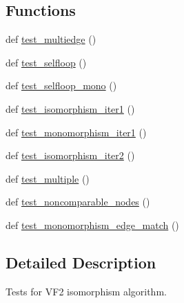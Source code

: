 \subsection*{Functions}
\begin{DoxyCompactItemize}
\item 
def \hyperlink{namespacenetworkx_1_1algorithms_1_1isomorphism_1_1tests_1_1test__isomorphvf2_a16c198267f05f1ce08e5c5418473c906}{test\+\_\+multiedge} ()
\item 
def \hyperlink{namespacenetworkx_1_1algorithms_1_1isomorphism_1_1tests_1_1test__isomorphvf2_a59ebaa66ef46936e5bb4ddc4760243f4}{test\+\_\+selfloop} ()
\item 
def \hyperlink{namespacenetworkx_1_1algorithms_1_1isomorphism_1_1tests_1_1test__isomorphvf2_ad5dff7d8c3e988e4abf0a11b30c84f46}{test\+\_\+selfloop\+\_\+mono} ()
\item 
def \hyperlink{namespacenetworkx_1_1algorithms_1_1isomorphism_1_1tests_1_1test__isomorphvf2_a9d6de0d276a24e97cc2cd3a0bd77cc5e}{test\+\_\+isomorphism\+\_\+iter1} ()
\item 
def \hyperlink{namespacenetworkx_1_1algorithms_1_1isomorphism_1_1tests_1_1test__isomorphvf2_ada11c231df898c8f62b5acba12546a44}{test\+\_\+monomorphism\+\_\+iter1} ()
\item 
def \hyperlink{namespacenetworkx_1_1algorithms_1_1isomorphism_1_1tests_1_1test__isomorphvf2_a72aa5ba60599cb4bce5ad1114b6163cb}{test\+\_\+isomorphism\+\_\+iter2} ()
\item 
def \hyperlink{namespacenetworkx_1_1algorithms_1_1isomorphism_1_1tests_1_1test__isomorphvf2_a3d2e53529208510972ffa6cd0ca546a7}{test\+\_\+multiple} ()
\item 
def \hyperlink{namespacenetworkx_1_1algorithms_1_1isomorphism_1_1tests_1_1test__isomorphvf2_a6848366fe01c2e37e5f90f499bc55957}{test\+\_\+noncomparable\+\_\+nodes} ()
\item 
def \hyperlink{namespacenetworkx_1_1algorithms_1_1isomorphism_1_1tests_1_1test__isomorphvf2_af30c987a26176143fd04443d3c282523}{test\+\_\+monomorphism\+\_\+edge\+\_\+match} ()
\end{DoxyCompactItemize}


\subsection{Detailed Description}
\begin{DoxyVerb}    Tests for VF2 isomorphism algorithm.
\end{DoxyVerb}
 


